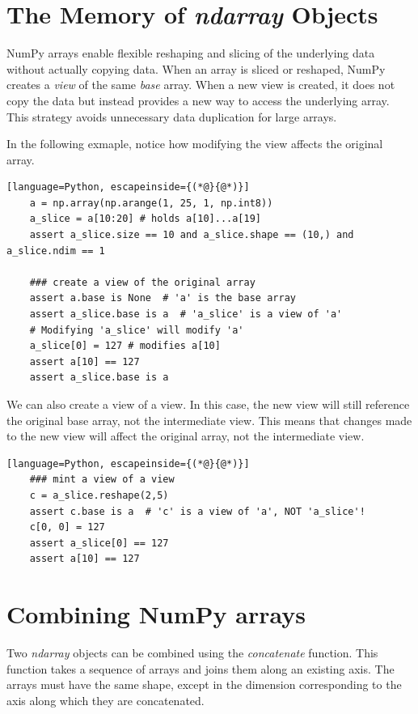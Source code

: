 \documentclass[12pt]{article}
\newcommand{\vsp}{\vspace*{8pt}}
\begin{document}
\section{The Memory of \emph{ndarray} Objects}
NumPy arrays enable flexible reshaping and slicing of the underlying data
without actually copying data. When an array is sliced or reshaped,
NumPy creates a \emph{view} of the same \emph{base} array.
When a new view is created, it does not copy the data but instead provides
a new way to access the underlying array. This strategy avoids unnecessary
data duplication for large arrays.

In the following exmaple, notice how modifying the view affects the original array.
\vsp\begin{lstlisting}[language=Python, escapeinside={(*@}{@*)}]
    a = np.array(np.arange(1, 25, 1, np.int8))
    a_slice = a[10:20] # holds a[10]...a[19]
    assert a_slice.size == 10 and a_slice.shape == (10,) and a_slice.ndim == 1

    ### create a view of the original array
    assert a.base is None  # 'a' is the base array
    assert a_slice.base is a  # 'a_slice' is a view of 'a'
    # Modifying 'a_slice' will modify 'a'
    a_slice[0] = 127 # modifies a[10]
    assert a[10] == 127
    assert a_slice.base is a
\end{lstlisting}

We can also create a view of a view. In this case, the new view will still reference
the original base array, not the intermediate view. This means that changes made
to the new view will affect the original array, not the intermediate view.

\vsp\begin{lstlisting}[language=Python, escapeinside={(*@}{@*)}]
    ### mint a view of a view
    c = a_slice.reshape(2,5)
    assert c.base is a  # 'c' is a view of 'a', NOT 'a_slice'!
    c[0, 0] = 127
    assert a_slice[0] == 127
    assert a[10] == 127
\end{lstlisting}


\section{Combining NumPy arrays}
Two \emph{ndarray} objects can be combined using the \emph{concatenate} function.
This function takes a sequence of arrays and joins them along an existing axis.
The arrays must have the same shape, except in the dimension corresponding
to the axis along which they are concatenated.
\end{document}
